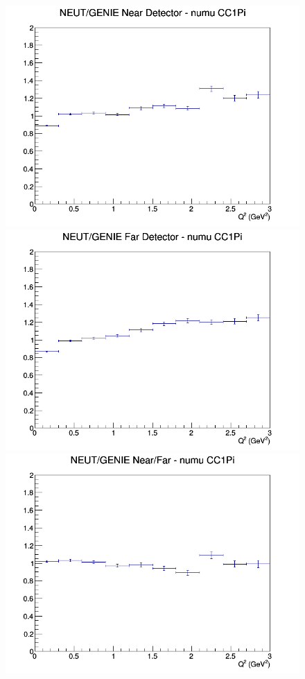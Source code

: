 \documentclass[12pt]{article}
\begin{document}
\begin{figure}[h]
\endminipage
\newline
{}
\includegraphics[width=\linewidth]{eff_Q2/LAr/ratios/CC1Pi_NEUT_GENIE_numu_near_Q2.png}
\endminipage
{}
\includegraphics[width=\linewidth]{eff_Q2/LAr/ratios/CC1Pi_NEUT_GENIE_numu_far_Q2.png}
\endminipage
{}
\includegraphics[width=\linewidth]{eff_Q2/LAr/ratios/CC1Pi_NEUT_GENIE_numu_NF_Q2.png}

\end{figure}
\end{document}
